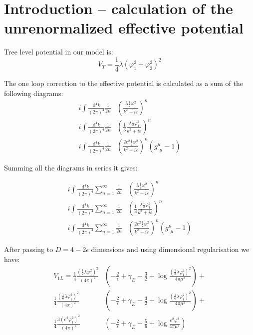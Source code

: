 \chapter{Introduction -- calculation of the unrenormalized effective potential}

Tree level potential in our model is:
\begin{equation}
V_T = \frac{1}{4}\lambda(\varphi_1^2+\varphi_2^2)^2
\end{equation}


The one loop correction to the effective potential is calculated as a sum of the following diagrams:
\\
\begin{align}
i\int \frac{\textrm{d}^4k}{(2\pi)^4}\frac{1}{2n}&\left(\frac{\lambda\frac{1}{2}\varphi_1^2}
{k^2+i\varepsilon}\right)^n \\
i\int \frac{\textrm{d}^4k}{(2\pi)^4}\frac{1}{2n}&\left(\frac{1}{3}\frac{\lambda\frac{1}
{2}\varphi_1^2}
{k^2+i\varepsilon}\right)^n \\
i\int \frac{\textrm{d}^4k}{(2\pi)^4}\frac{1}{2n}&\left(\frac{2e^2\frac{1}{2}\varphi_1^2}
{k^2+i\varepsilon}\right)^n(g^\mu_{\ \,\mu} - 1)
\end{align}

Summing all the diagrams in series it gives:

\begin{align}
i\int \frac{\textrm{d}^4k}{(2\pi)^4}\sum\limits_{n=1}^{\infty}
\frac{1}{2n}&\left(\frac{\lambda\frac{1}{2}\varphi_1^2}
{k^2+i\varepsilon}\right)^n \\
i\int \frac{\textrm{d}^4k}{(2\pi)^4}\sum\limits_{n=1}^{\infty}\frac{1}{2n}&
\left(\frac{1}{3}\frac{\lambda\frac{1}{2}\varphi_1^2}
{k^2+i\varepsilon}\right)^n \\
i\int \frac{\textrm{d}^4k}{(2\pi)^4}\sum\limits_{n=1}^{\infty}\frac{1}{2n}&
\left(\frac{2e^2\frac{1}{2}\varphi_1^2}
{k^2+i\varepsilon}\right)^n(g^\mu_{\ \,\mu} - 1)
\end{align}

After passing to $D=4-2\epsilon$ dimensions and using dimensional regularisation we have:
\begin{align}
V_{1L}=\frac{1}{4}\frac{(\frac{1}{2}\lambda\varphi_1^2)^2}{(4\pi)^2}&\left(-\frac{2}{\epsilon}
+\gamma_E-\frac{3}{2}+\log{\frac{(\frac{1}{2}\lambda\varphi_1^2)^2}{4\pi\mu^2}}\right) + \\
\frac{1}{4}\frac{(\frac{1}{6}\lambda\varphi_1^2)^2}{(4\pi)^2}&\left(-\frac{2}{\epsilon}
+\gamma_E-\frac{3}{2}+\log{\frac{(\frac{1}{6}\lambda\varphi_1^2)^2}{4\pi\mu^2}}\right) + \\
\frac{1}{4}\frac{3(e^2\varphi_1^2)^2}{(4\pi)^2}&\left(-\frac{2}{\epsilon}+\gamma_E
-\frac{5}{6}+\log{\frac{e^2\varphi^2}{4\pi\mu^2}}\right)
\end{align}

